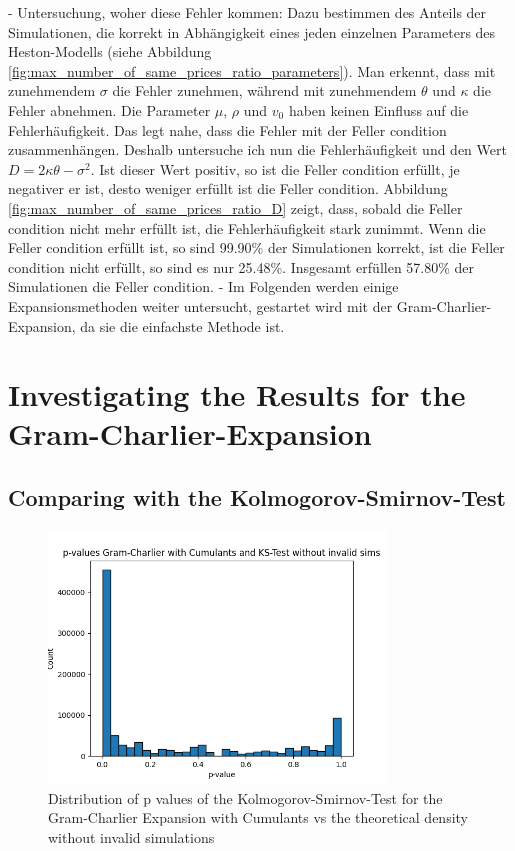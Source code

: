 - Untersuchung, woher diese Fehler kommen: Dazu bestimmen des Anteils der Simulationen, die korrekt in Abhängigkeit eines jeden einzelnen Parameters des Heston-Modells (siehe Abbildung \ref{fig:max_number_of_same_prices_ratio_parameters}). Man erkennt, dass mit zunehmendem $\sigma$ die Fehler zunehmen, während mit zunehmendem $\theta$ und $\kappa$ die Fehler abnehmen. Die Parameter $\mu$, $\rho$ und $v_0$ haben keinen Einfluss auf die Fehlerhäufigkeit. Das legt nahe, dass die Fehler mit der Feller condition zusammenhängen. Deshalb untersuche ich nun die Fehlerhäufigkeit und den Wert $D = 2\kappa\theta - \sigma^2$. Ist dieser Wert positiv, so ist die Feller condition erfüllt, je negativer er ist, desto weniger erfüllt ist die Feller condition. Abbildung \ref{fig:max_number_of_same_prices_ratio_D} zeigt, dass, sobald die Feller condition nicht mehr erfüllt ist, die Fehlerhäufigkeit stark zunimmt. Wenn die Feller condition erfüllt ist, so sind 99.90\% der Simulationen korrekt, ist die Feller condition nicht erfüllt, so sind es nur 25.48\%. Insgesamt erfüllen 57.80\% der Simulationen die Feller condition.
- Im Folgenden werden einige Expansionsmethoden weiter untersucht, gestartet wird mit der Gram-Charlier-Expansion, da sie die einfachste Methode ist.

\section{Investigating the Results for the Gram-Charlier-Expansion}

\subsection{Comparing with the Kolmogorov-Smirnov-Test}

\begin{figure}
    \centering
    \includegraphics[width=0.8\textwidth]{img/GC_cum_KS_p_value_histogram.png}
    \caption{Distribution of p values of the Kolmogorov-Smirnov-Test for the Gram-Charlier Expansion with Cumulants vs the theoretical density without invalid simulations}
    \label{fig:GC_cum_KS_p_value_histogram}
\end{figure}

